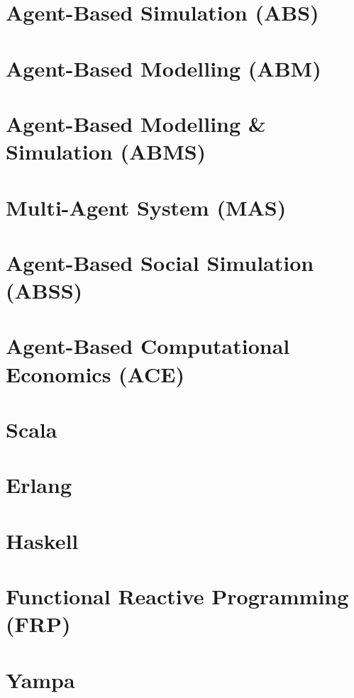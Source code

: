 \documentclass[oneside]{book}
\begin{document}
\section*{Agent-Based Simulation (ABS)}

\section*{Agent-Based Modelling (ABM)}

\section*{Agent-Based Modelling \& Simulation (ABMS)}

\section*{Multi-Agent System (MAS)}

\section*{Agent-Based Social Simulation (ABSS)}

\section*{Agent-Based Computational Economics (ACE)}

\section*{Scala}

\section*{Erlang}

\section*{Haskell}

\section*{Functional Reactive Programming (FRP)}

\section*{Yampa}
\end{document}
